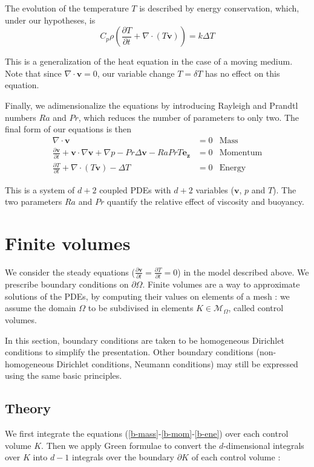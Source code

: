 \documentclass[12pt]{article}
\newcommand{\vb}[1]{\ensuremath{\mathbf{#1}}}
\begin{document}
The evolution of the temperature $T$ is described by energy
conservation, which, under our hypotheses, is
\begin{equation}
  C_p \rho \left(\frac{\partial T}{\partial t} + \nabla \cdot (T \vb{v})\right) = k \Delta T
\end{equation}

This is a generalization of the heat equation in the case of a moving
medium. Note that since $\nabla \cdot \vb{v} = 0$, our variable change
$T = \delta T$ has no effect on this equation.

Finally, we adimensionalize the equations by introducing Rayleigh and
Prandtl numbers $Ra$ and $Pr$, which reduces the number of parameters
to only two. The final form of our equations is then
\begin{align}
  \label{b-mass}
  \nabla \cdot \vb{v} &= 0& \text{Mass}\\
  \label{b-mom}
  \frac{\partial \mathbf{v}}{\partial t} + \mathbf{v} \cdot
    \nabla \mathbf{v} +\nabla p - Pr \Delta \vb{v} - Ra Pr T
  \vb{e_z} &= 0& \text{Momentum}\\
  \label{b-ene}
  \frac{\partial T}{\partial t} + \nabla \cdot (T \vb{v}) - \Delta
  T&=0& \text{Energy}
\end{align}

This is a system of $d + 2$ coupled PDEs with $d+2$ variables
($\vb{v}$, $p$ and $T$). The two parameters $Ra$ and $Pr$ quantify the
relative effect of viscosity and buoyancy.

\section{Finite volumes}
We consider the steady equations ($\frac{\partial \vb{v}}{\partial t}
= \frac{\partial T}{\partial t} = 0$) in the model described above. We
prescribe boundary conditions on $\partial \Omega$. Finite volumes are
a way to approximate solutions of the PDEs, by computing their values
on elements of a mesh : we assume the domain $\Omega$ to be subdivised
in elements $K \in \mathcal{M}_\Omega$, called control volumes.

In this section, boundary conditions are taken to be homogeneous
Dirichlet conditions to simplify the presentation. Other boundary
conditions (non-homogeneous Dirichlet conditions, Neumann conditions)
may still be expressed using the same basic principles.
\subsection{Theory}
We first integrate the equations
(\ref{b-mass}-\ref{b-mom}-\ref{b-ene}) over each control volume
$K$. Then we apply Green formulae to convert the $d$-dimensional
integrals over $K$ into $d-1$ integrals over the boundary $\partial K$
of each control volume :
\end{document}
